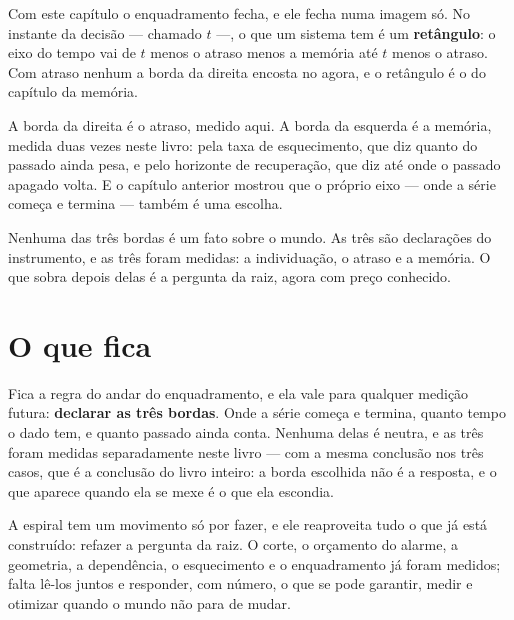 Com este capítulo o enquadramento fecha, e ele fecha numa imagem só. No instante da decisão --- chamado $t$ ---, o que
um sistema tem é um \textbf{retângulo}: o eixo do tempo vai de $t$ menos o atraso menos a memória até
$t$ menos o atraso. Com atraso nenhum a borda da direita encosta no agora, e o retângulo é o do
capítulo da memória.

A borda da direita é o atraso, medido aqui. A borda da esquerda é a memória, medida duas vezes neste
livro: pela taxa de esquecimento, que diz quanto do passado ainda pesa, e pelo horizonte de
recuperação, que diz até onde o passado apagado volta. E o capítulo anterior mostrou que o próprio
eixo --- onde a série começa e termina --- também é uma escolha.

Nenhuma das três bordas é um fato sobre o mundo. As três são declarações do instrumento, e as três
foram medidas: a individuação, o atraso e a memória. O que sobra depois delas é a pergunta da raiz,
agora com preço conhecido.

\section{O que fica}

Fica a regra do andar do enquadramento, e ela vale para qualquer medição futura: \textbf{declarar as três
bordas}. Onde a série começa e termina, quanto tempo o dado tem, e quanto passado ainda conta.
Nenhuma delas é neutra, e as três foram medidas separadamente neste livro --- com a mesma conclusão
nos três casos, que é a conclusão do livro inteiro: a borda escolhida não é a resposta, e o que
aparece quando ela se mexe é o que ela escondia.

A espiral tem um movimento só por fazer, e ele reaproveita tudo o que já está construído: refazer a pergunta da
raiz. O corte, o orçamento do alarme, a
geometria, a dependência, o esquecimento e o enquadramento já foram medidos; falta lê-los juntos e
responder, com número, o que se pode garantir, medir e otimizar quando o mundo não para de mudar.
